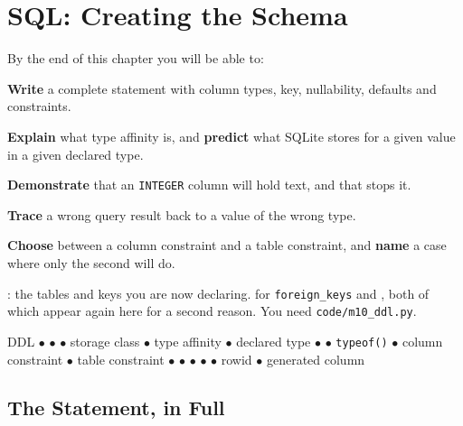 \chapter{SQL: Creating the Schema}\label{ch:ddl}

\begin{outcomes}
By the end of this chapter you will be able to:
\begin{tight}
  \item \textbf{Write} a complete  statement with column
        types, key, nullability, defaults and  constraints.
  \item \textbf{Explain} what type affinity is, and \textbf{predict} what
        SQLite stores for a given value in a given declared type.
  \item \textbf{Demonstrate} that an \texttt{INTEGER} column will hold text,
        and that  stops it.
  \item \textbf{Trace} a wrong query result back to a value of the wrong type.
  \item \textbf{Choose} between a column constraint and a table constraint, and
        \textbf{name} a case where only the second will do.
\end{tight}
\end{outcomes}

\begin{prereq}
: the tables and keys you are now declaring.
 for  \texttt{foreign\_keys} and , both of which appear again here for a second reason. You need
\texttt{code/m10\_ddl.py}.
\end{prereq}

\begin{keyterms}
DDL $\bullet$  $\bullet$  $\bullet$
storage class $\bullet$ type affinity $\bullet$ declared type $\bullet$
 $\bullet$ \texttt{typeof()} $\bullet$ column constraint
$\bullet$ table constraint $\bullet$  $\bullet$ 
$\bullet$  $\bullet$  $\bullet$ rowid
$\bullet$ generated column
\end{keyterms}

\section{The Statement, in Full}

